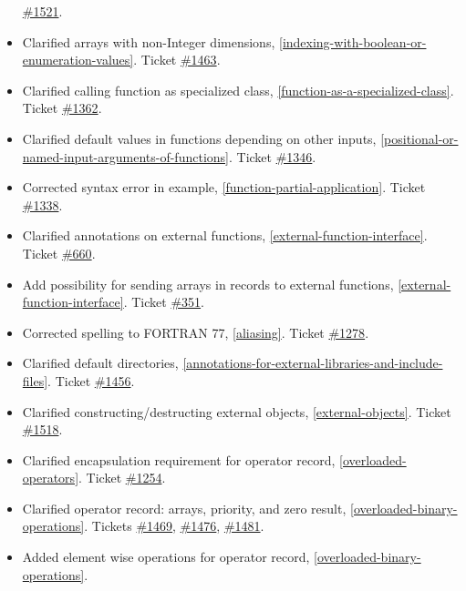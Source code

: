\begin{itemize}
  \href{https://trac.modelica.org/Modelica/ticket/1521}{\#1521}.
\item
  Clarified arrays with non-Integer dimensions, \autoref{indexing-with-boolean-or-enumeration-values}. Ticket
  \href{https://trac.modelica.org/Modelica/ticket/1463}{\#1463}.
\item
  Clarified calling function as specialized class, \autoref{function-as-a-specialized-class}. Ticket
  \href{https://trac.modelica.org/Modelica/ticket/1362}{\#1362}.
\item
  Clarified default values in functions depending on other inputs,
  \autoref{positional-or-named-input-arguments-of-functions}. Ticket
  \href{https://trac.modelica.org/Modelica/ticket/1346}{\#1346}.
\item
  Corrected syntax error in example, \autoref{function-partial-application}. Ticket
  \href{https://trac.modelica.org/Modelica/ticket/1338}{\#1338}.
\item
  Clarified annotations on external functions, \autoref{external-function-interface}. Ticket
  \href{https://trac.modelica.org/Modelica/ticket/660}{\#660}.
\item
  Add possibility for sending arrays in records to external functions,
  \autoref{external-function-interface}. Ticket
  \href{https://trac.modelica.org/Modelica/ticket/351}{\#351}.
\item
  Corrected spelling to FORTRAN 77, \autoref{aliasing}. Ticket
  \href{https://trac.modelica.org/Modelica/ticket/1278}{\#1278}.
\item
  Clarified default directories, \autoref{annotations-for-external-libraries-and-include-files}. Ticket
  \href{https://trac.modelica.org/Modelica/ticket/1456}{\#1456}.
\item
  Clarified constructing/destructing external objects, \autoref{external-objects}.
  Ticket \href{https://trac.modelica.org/Modelica/ticket/1518}{\#1518}.
\item
  Clarified encapsulation requirement for operator record, \autoref{overloaded-operators}.
  Ticket \href{https://trac.modelica.org/Modelica/ticket/1254}{\#1254}.
\item
  Clarified operator record: arrays, priority, and zero result, 
  \autoref{overloaded-binary-operations}. Tickets
  \href{https://trac.modelica.org/Modelica/ticket/1469}{\#1469},
  \href{https://trac.modelica.org/Modelica/ticket/1476}{\#1476},
  \href{https://trac.modelica.org/Modelica/ticket/1481}{\#1481}.
\item
  Added element wise operations for operator record, \autoref{overloaded-binary-operations}.

\end{itemize}
